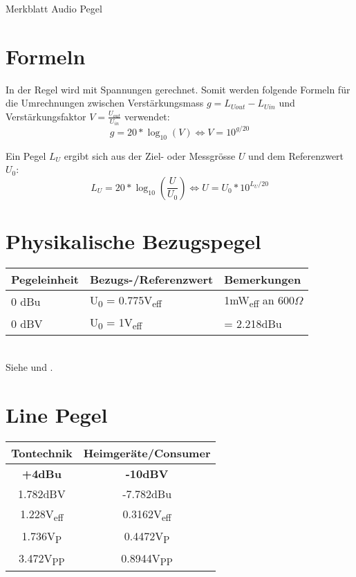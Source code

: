 \documentclass[9pt,german]{article}
\newcommand{\docTitle}{Merkblatt Audio Pegel}
\begin{document}
{\Large \docTitle}

\section*{Formeln}
In der Regel wird mit Spannungen gerechnet. Somit werden folgende Formeln f\"ur die Umrechnungen zwischen
Verst\"arkungsmass $g = L_{Uout} - L_{Uin}$ und Verst\"arkungsfaktor $V=\frac{U_{out}}{U_{in}}$ verwendet:
$$ g = 20 * \log_{10}(V) \Leftrightarrow V = 10^{g/20} $$

Ein Pegel $L_U$ ergibt sich aus der Ziel- oder Messgr\"osse $U$ und dem Referenzwert $U_0$:
$$ L_U = 20 * \log_{10}(\frac{U}{U_0})  \Leftrightarrow U = U_0 * 10^{L_U/20} $$



\section*{Physikalische Bezugspegel}
\begin{tabular}{|l|l|l|}
    \hline
    \textbf{Pegeleinheit} & \textbf{Bezugs-/Referenzwert} & \textbf{Bemerkungen} \\
    \hline
    0 dBu & U\textsubscript{0} = 0.775V\textsubscript{eff} & 1mW\textsubscript{eff} an 600$\Omega$ \\
    \hline
    0 dBV & U\textsubscript{0} = 1V\textsubscript{eff} &  = 2.218dBu \\
    \hline
\end{tabular}
\\

{\small Siehe \cite[Bezugspegel]{adt} und \cite{kirstein}.}



\section*{Line Pegel}
\begin{tabular}{|c|c|}
    \hline
    \textbf{Tontechnik} & \textbf{Heimger\"ate/Consumer} \\
    \hline
    \textbf{+4dBu}              & \textbf{-10dBV} \\
    1.782dBV                    & -7.782dBu \\
    1.228V\textsubscript{eff}   & 0.3162V\textsubscript{eff} \\
    1.736V\textsubscript{P}     & 0.4472V\textsubscript{P} \\
    3.472V\textsubscript{PP}    & 0.8944V\textsubscript{PP} \\
    \hline
\end{tabular}
\\
\end{document}
